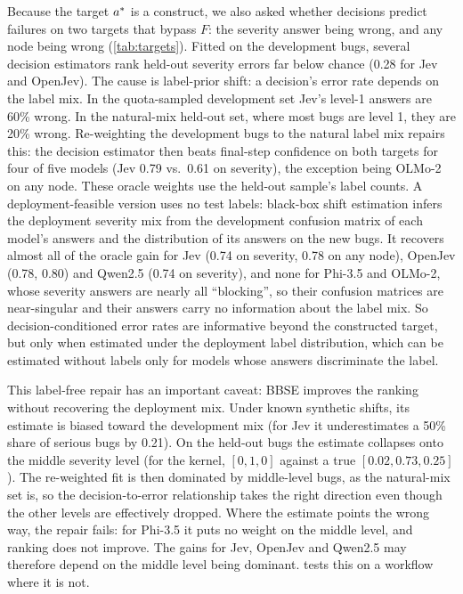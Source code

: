 \begin{coltable}
\centering
\caption{Exploratory: held-out AUROC of the decision-only estimator on two
targets that do not pass through the action rule $F$, fitted on the
quota-sampled development bugs (``dev fit'') or on the same bugs
re-weighted to the natural label mix, against final-step confidence. Bold:
re-weighted estimator above confidence.}
\label{tab:targets}
\small
\resizebox{\linewidth}{!}{}
\end{coltable}

 Because the target
$a^{*}$ is a construct, we also asked whether decisions predict failures
on two targets that bypass $F$: the severity answer being wrong, and any
node being wrong (\cref{tab:targets}). Fitted on the development bugs,
several decision estimators rank held-out severity errors far below
chance (0.28 for Jev and OpenJev). The cause is label-prior shift: a
decision's error rate depends on the label mix. In the quota-sampled
development set Jev's level-1 answers are 60\% wrong. In the natural-mix
held-out set, where most bugs are level 1, they are 20\% wrong. Re-weighting
the development bugs to the natural label mix repairs this: the decision
estimator then beats final-step confidence on both targets for four of
five models (Jev 0.79 vs.\ 0.61 on severity), the exception being OLMo-2
on any node. These oracle weights use the held-out sample's label counts.
A deployment-feasible version uses no test labels: black-box shift
estimation \citep{lipton2018bbse} infers the deployment severity mix from
the development confusion matrix of each model's \score{} answers and
the distribution of its answers on the new bugs. It recovers almost all
of the oracle gain for Jev (0.74 on severity, 0.78 on any node), OpenJev
(0.78, 0.80) and Qwen2.5 (0.74 on severity), and none for Phi-3.5 and
OLMo-2, whose severity answers are nearly all ``blocking'', so their
confusion matrices are near-singular and their answers carry no
information about the label mix. So decision-conditioned error rates
are informative beyond the constructed target, but only when
estimated under the deployment label distribution, which can be
estimated without labels only for models whose answers discriminate the
label.

This label-free repair has an important caveat: BBSE improves the
ranking without recovering the deployment mix. Under known synthetic
shifts, its estimate is biased toward the development mix (for Jev it
underestimates a 50\% share of serious bugs by 0.21). On the held-out
bugs the estimate collapses onto the middle severity level (for the
kernel, $[0, 1, 0]$ against a true $[0.02, 0.73, 0.25]$). The
re-weighted fit is then dominated by middle-level bugs, as the
natural-mix set is, so the decision-to-error relationship takes the
right direction even though the other levels are effectively dropped.
Where the estimate points the wrong way, the repair fails: for Phi-3.5
it puts no weight on the middle level, and ranking does not improve.
The gains for Jev, OpenJev and Qwen2.5 may therefore depend on the
middle level being dominant.  tests this on a workflow
where it is not.

